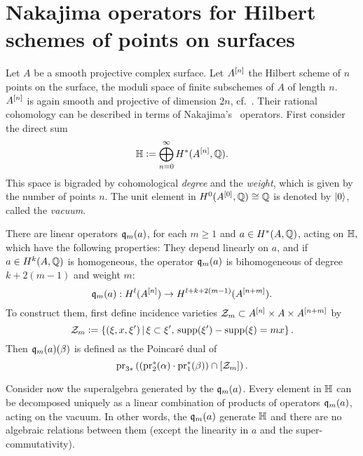 \section[Nakajima operators for Hilbert schemes of points on surfaces]{Nakajima operators for Hilbert schemes of points on surfaces%
}
\label{Section_Hilbert}
Let $A$ be a smooth projective complex surface. 
Let $A^{[n]}$ the Hilbert scheme of $n$ points on the surface, \ie the moduli space of finite subschemes of $A$ of length $n$.
$A^{[n]}$ is again smooth and projective of dimension $2n$, cf.~\cite{Fogarty}. 
Their rational cohomology can be described in terms of Nakajima's~\cite{Nakajima} operators. First consider the direct sum
$$
\mathbb{H} \vcentcolon=  \bigoplus_{n=0}^{\infty} H^*(A^{[n]},\mathbb{Q}).
$$
This space is bigraded by cohomological \emph{degree} and the \emph{weight}, which is given by the number of points $n$. The unit element in $H^0(A^{[0]},\mathbb{Q}) \cong \mathbb{Q}$ is denoted by $|0\rangle$, called the \emph{vacuum}.
\begin{defipro}
There are linear operators $\mathfrak{q}_m(a)$, for each $m\geq 1$ and $a \in H^*(A,\mathbb{Q})$, acting on $\mathbb{H},$ which have the following properties: They depend linearly on $a$, and if $a\in H^k(A,\mathbb{Q})$ is homogeneous, the operator $\mathfrak{q}_{m}(a)$ is bihomogeneous of degree $k+2(m-1)$ and weight $m$:
$$
\mathfrak{q}_{m}(a) : H^l(A^{[n]}) \rightarrow H^{l+k+2(m-1)}(A^{[n+m]}).
$$
To construct them, first define incidence varieties $\mathcal Z_m\subset A^{[n]}\times A\times A^{[n+m]}$ by
$$
\mathcal Z_m \vcentcolon=  \left\{(\xi,x,\xi')\, |\, \xi\subset\xi',\, \operatorname{supp}(\xi') -\operatorname{supp}(\xi) = mx \right\}.
$$
Then $\mathfrak{q}_m(a)(\beta) $ is defined as the Poincar\'e dual of 
$$
\operatorname{pr}_{3*}\left( \left(\operatorname{pr}_2^*(\alpha)\cdot \operatorname{pr}_1^*(\beta)\right) \cap [\mathcal Z_m] \right).
$$
\end{defipro}
Consider now the superalgebra generated by the $\mathfrak{q}_m(a)$. 
Every element in $\mathbb{H}$ can be decomposed uniquely as a linear combination of products of operators $\mathfrak{q}_{m}(a)$, acting on the vacuum. 
In other words, the $\mathfrak{q}_m(a)$ generate $\mathbb{H}$ and there are no algebraic relations between them (except the linearity in $a$ and the super-commutativity).


